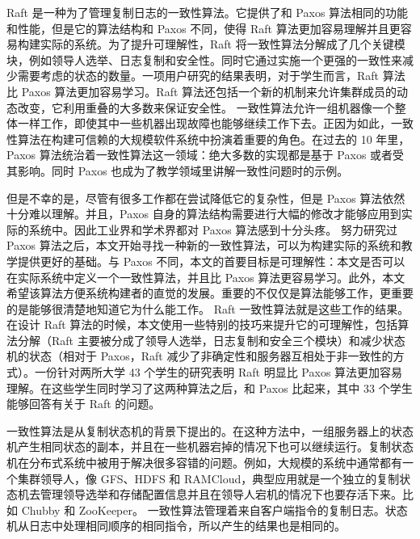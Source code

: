% 	


Raft 是一种为了管理复制日志的一致性算法。它提供了和 Paxos 算法相同的功能和性能，但是它的算法结构和 Paxos 不同，使得 Raft 算法更加容易理解并且更容易构建实际的系统。为了提升可理解性，Raft 将一致性算法分解成了几个关键模块，例如领导人选举、日志复制和安全性。同时它通过实施一个更强的一致性来减少需要考虑的状态的数量。一项用户研究的结果表明，对于学生而言，Raft 算法比 Paxos 算法更加容易学习。Raft 算法还包括一个新的机制来允许集群成员的动态改变，它利用重叠的大多数来保证安全性。
一致性算法允许一组机器像一个整体一样工作，即使其中一些机器出现故障也能够继续工作下去。正因为如此，一致性算法在构建可信赖的大规模软件系统中扮演着重要的角色。在过去的 10 年里，Paxos 算法统治着一致性算法这一领域：绝大多数的实现都是基于 Paxos 或者受其影响。同时 Paxos 也成为了教学领域里讲解一致性问题时的示例。

但是不幸的是，尽管有很多工作都在尝试降低它的复杂性，但是 Paxos 算法依然十分难以理解。并且，Paxos 自身的算法结构需要进行大幅的修改才能够应用到实际的系统中。因此工业界和学术界都对 Paxos 算法感到十分头疼。
努力研究过 Paxos 算法之后，本文开始寻找一种新的一致性算法，可以为构建实际的系统和教学提供更好的基础。与 Paxos 不同，本文的首要目标是可理解性：本文是否可以在实际系统中定义一个一致性算法，并且比 Paxos 算法更容易学习。此外，本文希望该算法方便系统构建者的直觉的发展。重要的不仅仅是算法能够工作，更重要的是能够很清楚地知道它为什么能工作。
Raft 一致性算法就是这些工作的结果。在设计 Raft 算法的时候，本文使用一些特别的技巧来提升它的可理解性，包括算法分解（Raft 主要被分成了领导人选举，日志复制和安全三个模块）和减少状态机的状态（相对于 Paxos，Raft 减少了非确定性和服务器互相处于非一致性的方式）。一份针对两所大学 43 个学生的研究表明 Raft 明显比 Paxos 算法更加容易理解。在这些学生同时学习了这两种算法之后，和 Paxos 比起来，其中 33 个学生能够回答有关于 Raft 的问题。

一致性算法是从复制状态机的背景下提出的。在这种方法中，一组服务器上的状态机产生相同状态的副本，并且在一些机器宕掉的情况下也可以继续运行。复制状态机在分布式系统中被用于解决很多容错的问题。例如，大规模的系统中通常都有一个集群领导人，像 GFS、HDFS 和 RAMCloud，典型应用就是一个独立的复制状态机去管理领导选举和存储配置信息并且在领导人宕机的情况下也要存活下来。比如 Chubby 和 ZooKeeper。
一致性算法管理着来自客户端指令的复制日志。状态机从日志中处理相同顺序的相同指令，所以产生的结果也是相同的。

